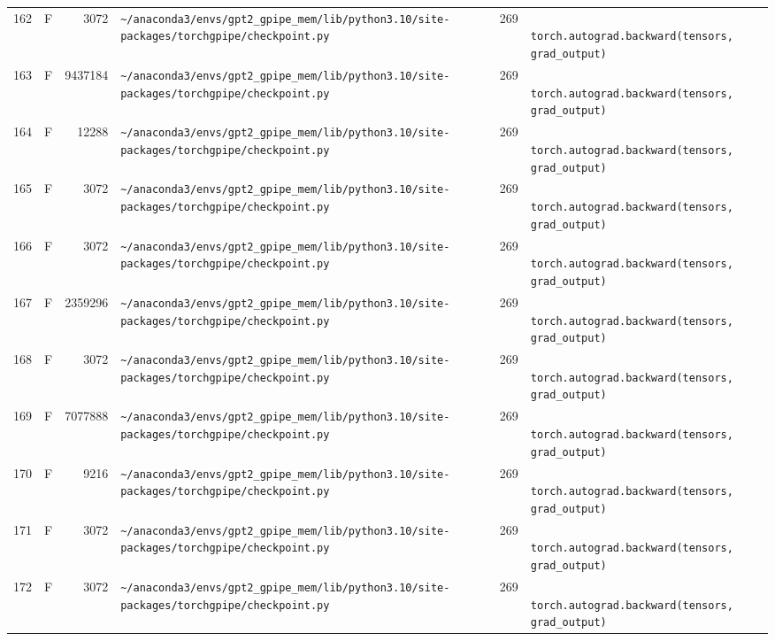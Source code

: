 \documentclass{article}
\begin{document}
\begin{longtable}{r l r p{6.5cm} r p{7.0cm}}
162 & F & 3072 & \lstinline|~/anaconda3/envs/gpt2_gpipe_mem/lib/python3.10/site-packages/torchgpipe/checkpoint.py| & 269 & \lstinline|            torch.autograd.backward(tensors, grad_output)| \\
163 & F & 9437184 & \lstinline|~/anaconda3/envs/gpt2_gpipe_mem/lib/python3.10/site-packages/torchgpipe/checkpoint.py| & 269 & \lstinline|            torch.autograd.backward(tensors, grad_output)| \\
164 & F & 12288 & \lstinline|~/anaconda3/envs/gpt2_gpipe_mem/lib/python3.10/site-packages/torchgpipe/checkpoint.py| & 269 & \lstinline|            torch.autograd.backward(tensors, grad_output)| \\
165 & F & 3072 & \lstinline|~/anaconda3/envs/gpt2_gpipe_mem/lib/python3.10/site-packages/torchgpipe/checkpoint.py| & 269 & \lstinline|            torch.autograd.backward(tensors, grad_output)| \\
166 & F & 3072 & \lstinline|~/anaconda3/envs/gpt2_gpipe_mem/lib/python3.10/site-packages/torchgpipe/checkpoint.py| & 269 & \lstinline|            torch.autograd.backward(tensors, grad_output)| \\
167 & F & 2359296 & \lstinline|~/anaconda3/envs/gpt2_gpipe_mem/lib/python3.10/site-packages/torchgpipe/checkpoint.py| & 269 & \lstinline|            torch.autograd.backward(tensors, grad_output)| \\
168 & F & 3072 & \lstinline|~/anaconda3/envs/gpt2_gpipe_mem/lib/python3.10/site-packages/torchgpipe/checkpoint.py| & 269 & \lstinline|            torch.autograd.backward(tensors, grad_output)| \\
169 & F & 7077888 & \lstinline|~/anaconda3/envs/gpt2_gpipe_mem/lib/python3.10/site-packages/torchgpipe/checkpoint.py| & 269 & \lstinline|            torch.autograd.backward(tensors, grad_output)| \\
170 & F & 9216 & \lstinline|~/anaconda3/envs/gpt2_gpipe_mem/lib/python3.10/site-packages/torchgpipe/checkpoint.py| & 269 & \lstinline|            torch.autograd.backward(tensors, grad_output)| \\
171 & F & 3072 & \lstinline|~/anaconda3/envs/gpt2_gpipe_mem/lib/python3.10/site-packages/torchgpipe/checkpoint.py| & 269 & \lstinline|            torch.autograd.backward(tensors, grad_output)| \\
172 & F & 3072 & \lstinline|~/anaconda3/envs/gpt2_gpipe_mem/lib/python3.10/site-packages/torchgpipe/checkpoint.py| & 269 & \lstinline|            torch.autograd.backward(tensors, grad_output)| \\

\end{longtable}
\end{document}
